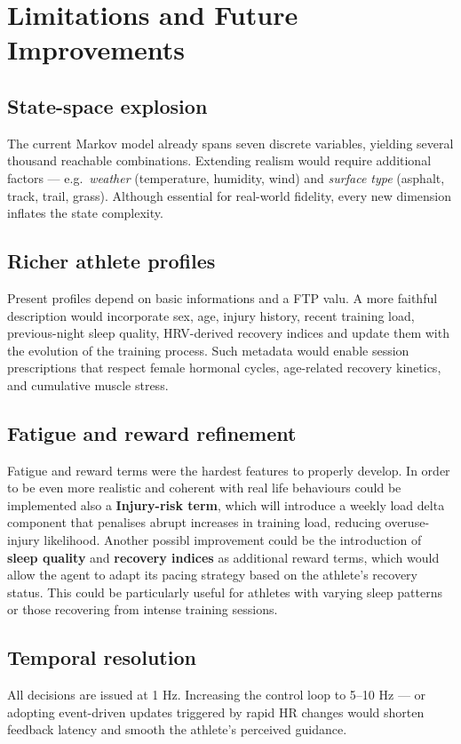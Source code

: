 \section{Limitations and Future Improvements}\label{sec:limitations}

\subsection{State-space explosion}
The current Markov model already spans seven discrete variables, yielding several thousand reachable combinations.  Extending realism would require additional factors — e.g.\ \emph{weather} (temperature, humidity, wind) and \emph{surface type} (asphalt, track, trail, grass). Although essential for real-world fidelity, every new dimension inflates the state complexity.

\subsection{Richer athlete profiles}
Present profiles depend on basic informations and a FTP valu. A more faithful description would incorporate sex, age, injury history, recent training load, previous-night sleep quality, HRV-derived recovery indices and update them with the evolution of the training process. 
Such metadata would enable session prescriptions that respect female hormonal cycles, age-related recovery kinetics, and cumulative muscle stress.

\subsection{Fatigue and reward refinement}
Fatigue and reward terms were the hardest features to properly develop. In order to be even more realistic and coherent with real life behaviours could be implemented also a \textbf{Injury-risk term}, which will introduce a weekly load delta component that penalises abrupt increases in training load, reducing overuse-injury likelihood.
Another possibl improvement could be the introduction of \textbf{sleep quality} and \textbf{recovery indices} as additional reward terms, which would allow the agent to adapt its pacing strategy based on the athlete's recovery status. This could be particularly useful for athletes with varying sleep patterns or those recovering from intense training sessions.

\subsection{Temporal resolution}
All decisions are issued at 1 Hz. Increasing the control loop to 5–10 Hz — or adopting event-driven updates triggered by rapid HR changes would shorten feedback latency and smooth the athlete's perceived guidance.

